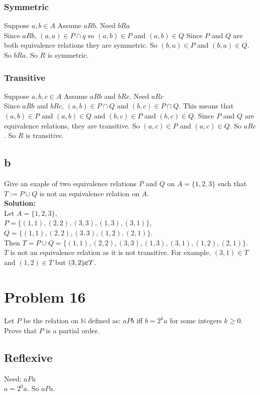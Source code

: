 \documentclass{article}
\begin{document}
\subsubsection*{Symmetric}
Suppose $a,b \in A$ 
Assume $aRb$.
Need $bRa$\\
Since $aRb$, $(a,a) \in P \cap q$ so $(a,b) \in P$ and $(a,b) \in Q$ Since $P$ and $Q$ are both equivalence relations they are symmetric. So $(b,a) \in P$ and $(b,a) \in Q$. So $bRa$. So $R$ is symmetric.

\subsubsection*{Transitive}
Suppose $a,b,c \in A$
Assume $aRb$ and $bRc$.
Need $aRc$\\
Since $aRb$ and $bRc$, $(a,b) \in P \cap Q$ and $(b,c) \in P \cap Q$. This means that $(a,b) \in P$ and $(a,b) \in Q$ and $(b,c) \in P$ and $(b,c) \in Q$. Since $P$ and $Q$ are equivalence relations, they are transitive. So $(a,c) \in P$ and $(a,c) \in Q$. So $aRc$. So $R$ is transitive.\\

\subsection*{b}
Give an exaple of two equivalence relations $P$ and $Q$ on $A = \{ 1,2,3 \} $ such that $T := P \cup Q$ is not an equivalence relation on $A$.\\
\textbf{Solution:}\\
Let $A = \{ 1,2,3\}$, \\
$P = \{ (1,1), (2,2), (3,3), (1,3), (3,1) \}$, \\
$Q = \{ (1,1), (2,2), (3,3), (1,2), (2,1) \}$.\\
Then $T = P \cup Q = \{ (1,1), (2,2), (3,3), (1,3), (3,1), (1,2), (2,1) \}$.\\
$T$ is not an equivalence relation as it is not transitive. For example, $(3,1) \in T$ and $(1,2) \in T$ but $(3,2) \cancel{\in} T$.\\


\section*{Problem 16}
Let $P$ be the relation on $\mathbb{N}$ defined as: $aPb$ iff $b=2^ka$ for some integers $k \geq 0$. Prove that $P$ is a partial order.\\
\subsection*{Reflexive}
Need: $aPa$\\
$a = 2^0a$. So $aPa$.
\end{document}
